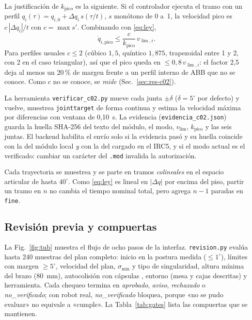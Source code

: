 \documentclass[conference]{IEEEtran}
\begin{document}
La justificación de $k_{\text{pico}}$ es la siguiente. Si el
controlador ejecuta el tramo con un perfil $q_i(\tau)=q_{i,0}+\Delta
q_i\,s(\tau/t)$, $s$ monótono de 0 a~1, la velocidad pico es
$c\,|\Delta q_i|/t$ con $c=\max s'$. Combinando con \eqref{eq:ley},
\begin{equation}
  \dot q_{i,\text{pico}}\le \frac{c}{k_{\text{pico}}}\,v_{\lim,i}.
  \label{eq:cota}
\end{equation}
Para perfiles usuales $c\le2$ (cúbico $1{,}5$, quíntico $1{,}875$,
trapezoidal entre 1 y 2, con 2 en el caso triangular), así que el pico
queda en $\le0{,}8\,v_{\lim,i}$: el factor 2{,}5 deja al menos un
20\,\% de margen frente a un perfil interno de ABB que no se conoce. Como $c$ no se conoce, se \emph{mide}
(Sec.~\ref{sec:res-c02}).

La herramienta \texttt{verificar\_c02.py} mueve cada junta $\pm\delta$
($\delta=5^\circ$ por defecto) y vuelve, muestrea \texttt{jointtarget}
de forma continua y estima la velocidad máxima por diferencias con
ventana de 0{,}10~s. La evidencia (\texttt{evidencia\_c02.json}) guarda
la huella SHA-256 del texto del módulo, el modo, $v_{\lim}$,
$k_{\text{pico}}$ y las seis juntas. El backend habilita el envío solo
si la evidencia pasó y su huella coincide con la del módulo local
\emph{y} con la del cargado en el IRC5, y si el modo actual es el
verificado: cambiar un carácter del \texttt{.mod} invalida la
autorización.

Cada trayectoria se muestrea y se parte en tramos \emph{colineales} en
el espacio articular de hasta $40^\circ$. Como \eqref{eq:ley} es lineal
en $|\Delta q|$ por encima del piso, partir un tramo en $n$ no cambia el
tiempo nominal total, pero agrega $n-1$ paradas en \texttt{fine}.

\subsection{Revisión previa y compuertas}

La Fig.~\ref{fig:tub} muestra el flujo de ocho pasos de la interfaz.
\texttt{revision.py} evalúa hasta 240 muestras del plan completo:
inicio en la postura medida ($\le1^\circ$), límites con margen
$\ge5^\circ$, velocidad del plan, $\sigma_{\min}$ y tipo de
singularidad, altura mínima del brazo (80~mm), autocolisión con
cápsulas \cite{b10}, entorno (mesa y cajas descritas) y herramienta. Cada chequeo
termina en \emph{aprobado}, \emph{aviso}, \emph{rechazado} o
\emph{no\_verificado}; con robot real, \emph{no\_verificado} bloquea,
porque «no se pudo evaluar» no equivale a «cumple». La
Tabla~\ref{tab:gates} lista las compuertas que se mantienen.
\end{document}
